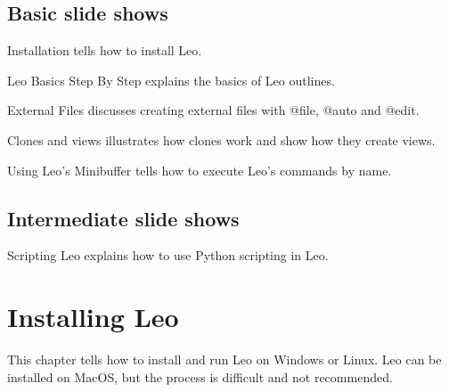 \documentclass[a4paper,10pt,english]{sphinxmanual}
\begin{document}
\section{Basic slide shows}
\label{slides:using-leo-s-minibuffer}\label{slides:basic-slide-shows}
Installation  tells how to install Leo.

Leo Basics Step By Step  explains the basics of Leo outlines.

External Files discusses creating external files with @file, @auto and @edit.

Clones and views illustrates how clones work and show how they create views.

Using Leo's Minibuffer tells how to execute Leo's commands by name.


\section{Intermediate slide shows}
\label{slides:intermediate-slide-shows}
Scripting Leo explains how to use Python scripting in Leo.


\chapter{Installing Leo}
\label{installing::doc}\label{installing:installing-leo}
This chapter tells how to install and run Leo on Windows or Linux.
Leo can be installed on MacOS, but the process is difficult and not recommended.
\end{document}
